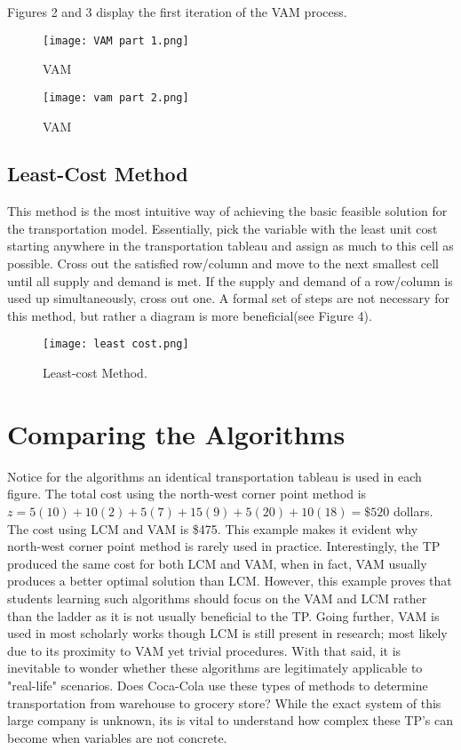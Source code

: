 \documentclass{article}
\begin{document}
Figures 2 and 3 display the first iteration of the VAM process.

\begin{figure}[h]
    \centering
    \texttt{[image: VAM part 1.png]}
    \caption{\label{fig:galaxy}VAM}
\end{figure}

\begin{figure}[h]
    \centering
    \texttt{[image: vam part 2.png]}
    \caption{\label{fig:galaxy2}VAM}
\end{figure}


\subsection{Least-Cost Method}

This method is the most intuitive way of achieving the basic feasible solution for the transportation model. Essentially, pick the variable with the least unit cost starting anywhere in the transportation tableau and assign as much to this cell as possible. Cross out the satisfied row/column and move to the next smallest cell until all supply and demand is met. If the supply and demand of a row/column is used up simultaneously, cross out one. A formal set of steps are not necessary for this method, but rather a diagram is more beneficial(see Figure 4). 

\begin{figure}[h!]
    \centering
    \texttt{[image: least cost.png]}
     \caption{\label{fig:lcm}Least-cost Method.}
    \label{fig:my_label}
\end{figure}



\section{Comparing the Algorithms}

Notice for the algorithms an identical transportation tableau is used in each figure. The total cost using the north-west corner point method is $z = 5(10)+10(2)+5(7)+15(9)+5(20)+10(18)= \$520$ dollars. The cost using LCM and VAM is \$475. This example makes it evident why north-west corner point method is rarely used in practice. Interestingly, the TP produced the same cost for both LCM and VAM, when in fact, VAM usually produces a better optimal solution than LCM. However, this example proves that students learning such algorithms should focus on the VAM and LCM rather than the ladder as it is not usually beneficial to the TP. Going further, VAM is used in most scholarly works though LCM is still present in research; most likely due to its proximity to VAM yet trivial procedures. With that said, it is inevitable to wonder whether these algorithms are legitimately applicable to "real-life" scenarios. Does Coca-Cola use these types of methods to determine transportation from warehouse to grocery store? While the exact system of this large company is unknown, its is vital to understand how complex these TP's can become when variables are not concrete. 
\end{document}
